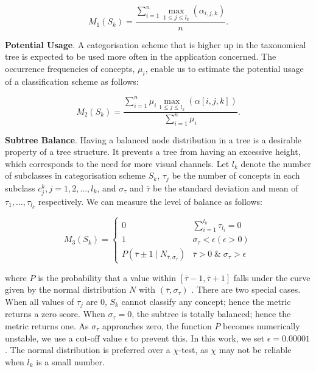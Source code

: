 \begin{equation}
\label{eq:Coverage}
  M_1(S_k) = \frac{\sum_{i=1}^{n} \max_{1 \leq j \leq l_k} (\alpha_{i,j,k})}{n}.
\end {equation}

\textbf{Potential Usage}.
A categorisation scheme that is higher up in the taxonomical tree is expected to be used more often in the application concerned.
The occurrence frequencies of concepts, $\mu_i$, enable us to estimate the potential usage of a classification scheme as follows:

\begin{equation}
\label{eq:Usage}
  M_2(S_k) = \frac{\sum_{i=1}^n \mu_i \max_{1 \leq j \leq l_k} (\alpha[i,j,k]) }
  {\sum_{i=1}^n \mu_i}.
\end {equation}

\textbf{Subtree Balance}.
Having a balanced node distribution in a tree is a desirable property of a tree structure.
It prevents a tree from having an excessive height, which corresponds to the need for more visual channels.
Let $l_k$ denote the number of subclasses in categorisation scheme $S_k$, $\tau_j$ be the number of concepts in each subclass $c^k_j, j=1, 2, \ldots, l_k$, and $\sigma_{\tau}$ and $\bar\tau$ be the standard deviation and mean of $\tau_1, \ldots, \tau_{l_k}$ respectively.
We can measure the level of balance as follows:

\begin{equation}
\label{eq:Branch}
  M_3(S_k) = \begin{cases}
    0 & \sum_{i=1}^{l_{k}} \tau_{l_i} = 0 \\
    1 & \sigma_{\tau} < \epsilon (\epsilon \gt 0) \\
    P(\bar\tau \pm1 \mid N_{\bar\tau, \sigma_{\tau}}) & \bar\tau \gt 0 \; \& \;\sigma_{\tau} > \epsilon
  \end{cases}
\end {equation}

\noindent where $P$ is the probability that a value within $[\bar{\tau}-1, \bar{\tau}+1]$ falls under
the curve given by the normal distribution $N$ with $(\bar{\tau}, \sigma_\tau)$ \cite{patel96}.
There are two special cases.
When all values of $\tau_j$ are 0, $S_k$ cannot classify any concept; hence the metric returns a zero score.
When $\sigma_\tau = 0$, the subtree is totally balanced; hence the metric returns one.
As $\sigma_\tau$ approaches zero, the function $P$ becomes numerically unstable, we use a cut-off value $\epsilon$ to prevent this. In this work, we set $\epsilon = 0.00001$.
The normal distribution is preferred over a $\chi$-test, as $\chi$ may not be reliable when $l_k$ is a small number.

